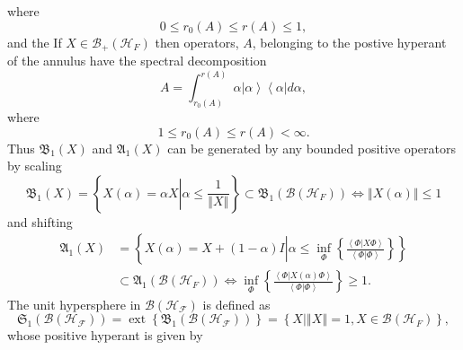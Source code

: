 \documentclass[aps,preprint]{revtex4}%
\begin{document}
where
\begin{equation}
0\leq r_{0}\left(  A\right)  \leq r\left(  A\right)  \leq1,
\end{equation}
and the If $X\in\mathcal{B}_{+}\left(  \mathcal{H}_{F}\right)  $ then
operators, $A$, belonging to the postive hyperant of the annulus have the
spectral decomposition
\begin{equation}
A=\int_{r_{0}\left(  A\right)  }^{r\left(  A\right)  }\alpha\left\vert
\alpha\right\rangle \left\langle \alpha\right\vert d\alpha,
\end{equation}
where
\begin{equation}
1\leq r_{0}\left(  A\right)  \leq r\left(  A\right)  <\infty.
\end{equation}
Thus $\mathfrak{B}_{1}\left(  X\right)  $ and $\mathfrak{A}_{1}\left(
X\right)  $ can be generated by any bounded positive operators by scaling
\begin{equation}
\mathfrak{B}_{1}\left(  X\right)  =\left\{  X\left(  \alpha\right)  =\alpha
X\left\vert \alpha\leq\frac{1}{\left\Vert X\right\Vert }\right.  \right\}
\subset\mathfrak{B}_{1}\left(  \mathcal{B}\left(  \mathcal{H}_{F}\right)
\right)  \Leftrightarrow\left\Vert X\left(  \alpha\right)  \right\Vert \leq1
\end{equation}
and shifting
\begin{align}
\mathfrak{A}_{1}\left(  X\right)   &  =\left\{  X\left(  \alpha\right)
=X+\left(  1-\alpha\right)  I\left\vert \alpha\leq\inf_{\Phi}\left\{
\frac{\left\langle \left.  \Phi\right\vert X\Phi\right\rangle }{\left\langle
\left.  \Phi\right\vert \Phi\right\rangle }\right\}  \right.  \right\}
\nonumber\\
&  \subset\mathfrak{A}_{1}\left(  \mathcal{B}\left(  \mathcal{H}_{F}\right)
\right)  \Leftrightarrow\inf_{\Phi}\left\{  \frac{\left\langle \left.
\Phi\right\vert X\left(  \alpha\right)  \Phi\right\rangle }{\left\langle
\left.  \Phi\right\vert \Phi\right\rangle }\right\}  \geq1.
\end{align}
The unit hypersphere in $\mathcal{B}\left(  \mathcal{H}_{\mathcal{F}}\right)
$ is defined as
\begin{equation}
\mathfrak{S}_{1}\left(  \mathcal{B}\left(  \mathcal{H}_{\mathcal{F}}\right)
\right)  =\operatorname*{ext}\left\{  \mathfrak{B}_{1}\left(  \mathcal{B}%
\left(  \mathcal{H}_{\mathcal{F}}\right)  \right)  \right\}  =\left\{
X\left\vert \left\Vert X\right\Vert =1,X\in\mathcal{B}\left(  \mathcal{H}%
_{F}\right)  \right.  \right\}  ,
\end{equation}
whose positive hyperant is given by
\end{document}
